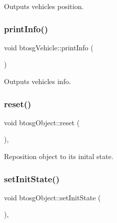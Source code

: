 Outputs vehicle\textquotesingle{}s position. \mbox{\label{classbtosgVehicle_abe98f64f0a8f37c7c0b244e3afbbcb15}} 
\subsubsection{\texorpdfstring{print\+Info()}{printInfo()}}
{\footnotesize\ttfamily void btosg\+Vehicle\+::print\+Info (\begin{DoxyParamCaption}{ }\end{DoxyParamCaption})\hspace{0.3cm}{\ttfamily [inline]}}

Outputs vehicle\textquotesingle{}s info. \mbox{\label{classbtosgObject_a93983f9180dd0672f8779cf2baa78580}} 
\subsubsection{\texorpdfstring{reset()}{reset()}}
{\footnotesize\ttfamily void btosg\+Object\+::reset (\begin{DoxyParamCaption}{ }\end{DoxyParamCaption})\hspace{0.3cm}{\ttfamily [inline]}, {\ttfamily [inherited]}}

Reposition object to its inital state. \mbox{\label{classbtosgObject_ad1508a0ce28cfac83e5f0ff6245f91b5}} 
\subsubsection{\texorpdfstring{set\+Init\+State()}{setInitState()}\hspace{0.1cm}{\footnotesize\ttfamily [1/2]}}
{\footnotesize\ttfamily void btosg\+Object\+::set\+Init\+State (\begin{DoxyParamCaption}{ }\end{DoxyParamCaption})\hspace{0.3cm}{\ttfamily [inline]}, {\ttfamily [inherited]}}

